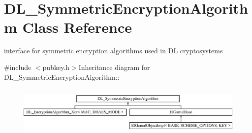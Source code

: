 \hypertarget{class_d_l___symmetric_encryption_algorithm}{
\section{DL\_\-SymmetricEncryptionAlgorithm Class Reference}
\label{class_d_l___symmetric_encryption_algorithm}
}


interface for symmetric encryption algorithms used in DL cryptosystems  


{\ttfamily \#include $<$pubkey.h$>$}Inheritance diagram for DL\_\-SymmetricEncryptionAlgorithm::\begin{figure}[H]
\begin{center}
\leavevmode
\includegraphics[height=2.47059cm]{class_d_l___symmetric_encryption_algorithm}
\end{center}
\end{figure}
